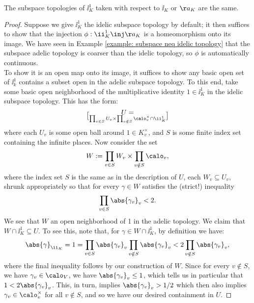 \documentclass[11pt, x11names, openany]{book}
\begin{document}
\begin{lemma}
\label{lemma: I_K^1 topology equivalence}
The subspace topologies of $\ii_K^1$ taken with respect to $\ii_K$ or $\aa_K$ are the same.
\end{lemma}
\begin{proof}
Suppose we give $\ii_K^1$ the idelic subspace topology by default; it then suffices to show that the injection $\phi: \ii_K^1 \inj \aa_K$ is a homeomorphism onto its image. We have seen in Example \ref{example: subspace neq idelic topology} that the subspace adelic topology is coarser than the idelic topology, so $\phi$ is automatically continuous.\\
To show it is an open map onto its image, it suffices to show any basic open set of $\ii_k^1$ contains a subset open in the adelic subspace topology. To this end, take some basic open neighborhood of the multiplicative identity $1 \in \ii_K^1$  in the idelic subspace topology. This has the form:
\begin{equation*}
    U = \brack{ \prod_{v \in S} U_v \times \prod_{v \notin S} \calo_v^\times } \cap \ii_K^1
\end{equation*}
where each $U_v$ is some open ball around $1 \in K_v^\times$, and $S$ is some finite index set containing the infinite places. Now consider the set
\begin{equation*}
    W := \prod_{v \in S} W_v \times \prod_{v \notin S} \calo_v,
\end{equation*}
where the index set $S$ is the same as in the description of $U$, each $W_v \subseteq U_v$, shrunk appropriately so that for every $\gamma \in W$ satisfies the (strict!) inequality
\begin{equation*}
    \prod_{v \in S} \abs{\gamma_v}_v < 2.
\end{equation*} 
We see that $W$ an open neighborhood of 1 in the adelic topology. We claim that $W \cap \ii_K^1 \subseteq U$. To see this, note that, for $\gamma \in W \cap \ii_K^1$, by definition we have:
\begin{equation*}
    \abs{\gamma}_{\ii_K} = 1 = \prod_{v \in S} \abs{\gamma_v}_v \prod_{v \notin S} \abs{\gamma_v}_v < 2 \prod_{v \notin S} \abs{\gamma_v}_v,
\end{equation*}
where the final inequality follows by our construction of $W$. Since for every $v \notin S$, we have $\gamma_v \in \calo_V$, we have $\abs{\gamma_v}_v \leq 1$, which tells us in particular that $1 < 2 \abs{\gamma_v}_v$. This, in turn, implies $\abs{\gamma_v}_v > 1/2$ which then also implies $\gamma_v \in \calo_v^\times$ for all $v \notin S$, and so we have our desired containment in $U$.
\end{proof}
\end{document}
